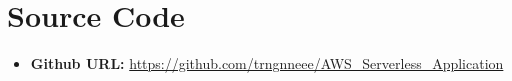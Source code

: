 \chapter{Source Code}

\begin{itemize}
    \item \textbf{Github URL:} \url{https://github.com/trngnneee/AWS_Serverless_Application}
\end{itemize}